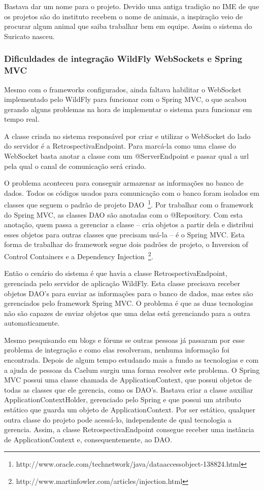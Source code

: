 Bastava dar um nome para o projeto. Devido uma antiga tradição no IME de que os projetos são do instituto recebem o nome de animais, a inspiração veio de procurar algum animal que saiba trabalhar bem em equipe. Assim o sistema do Suricato nasceu.

\subsubsection*{Dificuldades de integração WildFly WebSockets e Spring MVC}

Mesmo com o frameworks configurados, ainda faltava habilitar o WebSocket implementado pelo WildFly para funcionar com o Spring MVC, o que acabou gerando alguns problemas na hora de implementar o sistema para funcionar em tempo real.

A classe criada no sistema responsável por criar e utilizar o WebSocket do lado do servidor é a RetrospectivaEndpoint. Para marcá-la como uma classe do WebSocket basta anotar a classe com um @ServerEndpoint e passar qual a url pela qual o canal de comunicação será criado.

O problema aconteceu para conseguir armazenar as informações no banco de dados. Todos os códigos usados para comunicação com o banco foram isolados em classes que seguem o padrão de projeto DAO~\footnote{http://www.oracle.com/technetwork/java/dataaccessobject-138824.html}. Por trabalhar com o framework do Spring MVC, as classes DAO são anotadas com o @Repository. Com esta anotação, quem passa a gerenciar a classe -- cria objetos a partir dela e distribui esses objetos para outras classes que precisam usá-la -- é o Spring MVC. Esta forma de trabalhar do framework segue dois padrões de projeto, o Inversion of Control Containers e a Dependency Injection~\footnote{http://www.martinfowler.com/articles/injection.html}.

Então o cenário do sistema é que havia a classe RetrospectivaEndpoint, gerenciada pelo servidor de aplicação WildFly. Esta classe precisava receber objetos DAO's para enviar as informações para o banco de dados, mas estes são gerenciados pelo framework Spring MVC. O problema é que as duas tecnologias não são capazes de enviar objetos que uma delas está gerenciando para a outra automaticamente.

Mesmo pesquisando em blogs e fóruns se outras pessoas já passaram por esse problema de integração e como elas resolveram, nenhuma informação foi encontrada. Depois de algum tempo estudando mais a fundo as tecnologias e com a ajuda de pessoas da Caelum surgiu uma forma resolver este problema. O Spring MVC possui uma classe chamada de ApplicationContext, que possui objetos de todas as classes que ele gerencia, como os DAO's. Bastava criar a classe auxiliar ApplicationContextHolder, gerenciado pelo Spring e que possui um atributo estático que guarda um objeto de ApplicationContext. Por ser estático, qualquer outra classe do projeto pode acessá-lo, independente de qual tecnologia a gerencia. Assim, a classe RetrospectivaEndpoint consegue receber uma instância de ApplicationContext e, consequentemente, ao DAO.

